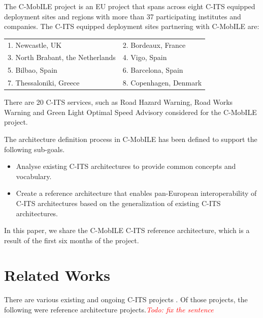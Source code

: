 \documentclass[conference]{IEEEtran}
\newcommand{\todo}[1]{\textcolor{red}{\emph{Todo: #1}}}
\begin{document}
The C-MobILE project is an EU project that spans across eight C-ITS equipped deployment sites and regions with more than 37 participating institutes and companies. 
The C-ITS equipped deployment sites partnering with C-MobILE are:

\begin{table}[ht!]
	\centering
	\begin{tabular}{ll}
	1. Newcastle, UK	& 2. Bordeaux, France \\
	3. North Brabant, the Netherlands	& 4. Vigo, Spain \\
	5. Bilbao, Spain	& 6. Barcelona, Spain\\
	7.  Thessaloniki, Greece	& 8. Copenhagen, Denmark  
	
	\end{tabular}
\end{table}

There are 20 C-ITS services, such as Road Hazard Warning, Road Works Warning and Green Light Optimal Speed Advisory considered for the C-MobILE project.

The architecture definition process in C-MobILE has been defined to support the following sub-goals.


\begin{itemize}
  \item Analyse existing C-ITS architectures to provide common concepts and vocabulary.
  \item Create a reference architecture that enables pan-European interoperability of C-ITS  architectures based on the generalization of existing C-ITS architectures.
\end{itemize}

In this paper, we share the C-MobILE C-ITS reference architecture, which is a result of the first six months of the project.

\section{Related Works}
There are various existing and ongoing C-ITS projects . Of those projects, the following were reference architecture projects.\todo{fix the sentence}
\end{document}
